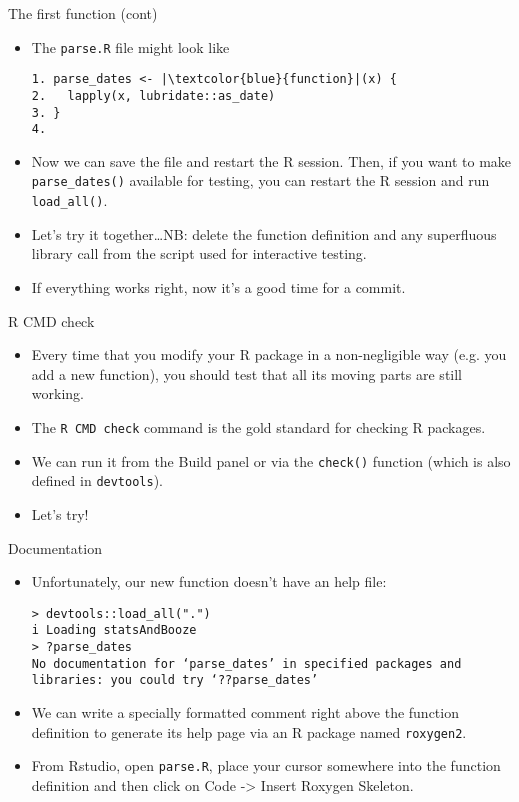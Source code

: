 \documentclass[
hyperref={bookmarks=false},
xcolor={dvipsnames,svgnames*,x11names*}, 
12pt
]{beamer}
\begin{document}
\begin{frame}[fragile]{The first function (cont)}
\vspace{-0.5cm}
\begin{itemize}
\itemsep 2ex
\item The \texttt{parse.R} file might look like 
\begin{lstlisting}
1. parse_dates <- |\textcolor{blue}{function}|(x) {
2.   lapply(x, lubridate::as_date)
3. }
4. 
\end{lstlisting}
\item Now we can save the file and restart the R session. Then, if you want to make \texttt{parse\_dates()} available for testing, you can restart the R session and run \texttt{load\_all()}. 
\item Let's try it together\dots \;NB: delete the function definition and any superfluous library call from the script used for interactive testing. 
\item If everything works right, now it's a good time for a commit. 
\end{itemize}
\end{frame}

\begin{frame}[fragile]{R CMD check}
\vspace{-0.5cm}
\begin{itemize}
\itemsep 3ex
\item Every time that you modify your R package in a non-negligible way (e.g. you add a new function), you should test that all its moving parts are still working. 
\item The \texttt{R CMD check} command is the gold standard for checking R packages. 
\item We can run it from the Build panel or via the \texttt{check()} function (which is also defined in \texttt{devtools}). 
\item Let's try!
\end{itemize}
\end{frame}

\begin{frame}[fragile]{Documentation}
\vspace{-0.5cm}
\begin{itemize}
\itemsep 2ex 
\item Unfortunately, our new function doesn't have an help file:
\begin{lstlisting}
> devtools::load_all(".")
i Loading statsAndBooze
> ?parse_dates
No documentation for ‘parse_dates’ in specified packages and libraries: you could try ‘??parse_dates’
\end{lstlisting}
\item We can write a specially formatted comment right above the function definition to generate its help page via an R package named \texttt{roxygen2}. 
\item From Rstudio, open \texttt{parse.R}, place your cursor somewhere into the function definition and then click on Code -> Insert Roxygen Skeleton. 
\end{itemize}
\end{frame}
\end{document}
